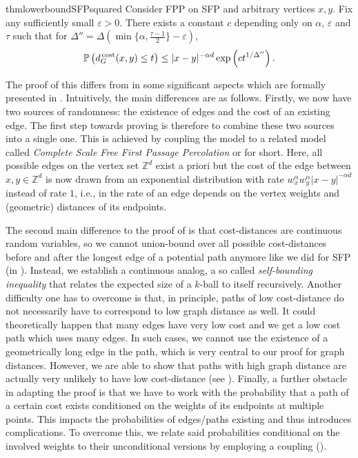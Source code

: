 \documentclass[11pt, letterpaper, margin=1in]{amsart}
\theoremstyle{definition}
\theoremstyle{remark}
\renewcommand{\Pr}[1]{\ensuremath{\mathbb{P} \left(#1 \right) }}
\newcommand{\eps}{\varepsilon}
\newcommand{\ZZ}{\mathbb{Z}}
\newcommand{\SFFPP}{FPP\xspace}
\newcommand{\alphaparam}{\alpha}
\newcommand{\tauparam}{\tau}
\newcommand{\graphdistcost}[2]{d^{\hspace{.05cm}\text{cost}}_{G}(#1, #2)}
\numberwithin{equation}{section}
\begin{document}
\begin{restatable}{thm}{lowerboundSFPsquared}\label{thm:lowerboundSFPsquared}
    Consider \SFFPP{} on SFP and arbitrary vertices $x, y$. Fix any sufficiently small $\eps > 0$. There exists a constant $c$ depending only on $\alphaparam$, $\eps$ and $\tauparam$ such that for $\Delta'' = \Delta(\min\{\alphaparam, \frac{\tauparam - 1}{2}\} - \eps)$,
    \begin{align*}
        \Pr{\graphdistcost{x}{y} \le t} \le |x - y|^{-\alphaparam d} \exp\left(ct^{1/\Delta''}\right).
    \end{align*}
\end{restatable}

The proof of this differs from  in some significant aspects which are formally presented in . Intuitively, the main differences are as follows. Firstly, we now have two sources of randomness: the existence of edges and the cost of an existing edge. The first step towards proving  is therefore to combine these two sources into a single one. This is achieved by coupling the model to a related model called \emph{Complete Scale Free First Passage Percolation} or \CFFPP{} for short. Here, all possible edges on the vertex set $\ZZ^d$ exist a priori but the cost of the edge between $x,y \in \ZZ^d$ is now drawn from an exponential distribution with rate $w_x^\alpha w_y^\alpha |x - y|^{-\alpha d}$ instead of rate $1$, i.e., in \CFFPP{} the rate of an edge depends on the vertex weights and (geometric) distances of its endpoints.

The second main difference to the proof of  is that cost-distances are continuous random variables, so we cannot union-bound over all possible cost-distances before and after the longest edge of a potential path anymore like we did for SFP (in ). Instead, we establish a continuous analog, a so called \emph{self-bounding inequality} that relates the expected size of a $k$-ball to itself recursively.
Another difficulty one has to overcome is that, in principle, paths of low cost-distance do not necessarily have to correspond to low graph distance as well. It could theoretically happen that many edges have very low cost and we get a low cost path which uses many edges. In such cases, we cannot use the existence of a geometrically long edge in the path, which is very central to our proof for graph distances. However, we are able to show that paths with high graph distance are actually very unlikely to have low cost-distance (see ). Finally, a further obstacle in adapting the proof is that we have to work with the probability that a path of a certain cost exists conditioned on the weights of its endpoints at multiple points. This impacts the probabilities of edges/paths existing and thus introduces complications. To overcome this, we relate said probabilities conditional on the involved weights to their unconditional versions by employing a coupling ().
\end{document}
